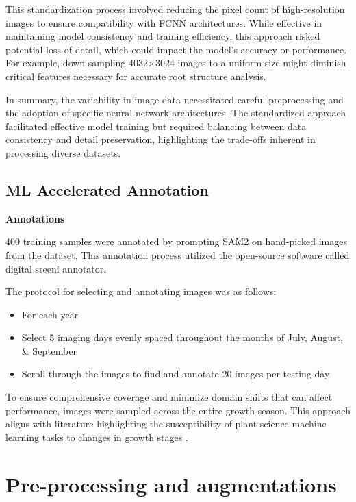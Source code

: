 This standardization process involved reducing the pixel count of high-resolution images to ensure compatibility with FCNN architectures. While effective in maintaining model consistency and training efficiency, this approach risked potential loss of detail, which could impact the model's accuracy or performance. For example, down-sampling 4032×3024 images to a uniform size might diminish critical features necessary for accurate root structure analysis. 

In summary, the variability in image data necessitated careful preprocessing and the adoption of specific neural network architectures. The standardized approach facilitated effective model training but required balancing between data consistency and detail preservation, highlighting the trade-offs inherent in processing diverse datasets. 

\subsection{ML Accelerated Annotation}
\textbf{Annotations}

400 training samples were annotated by prompting SAM2 on hand-picked images from the dataset. This annotation process utilized the open-source software called digital sreeni annotator.

The protocol for selecting and annotating images was as follows:
\begin{itemize}
    \item For each year
    \item Select 5 imaging days evenly spaced throughout the months of July, August, \& September
    \item Scroll through the images to find and annotate 20 images per testing day
\end{itemize}

To ensure comprehensive coverage and minimize domain shifts that can affect performance, images were sampled across the entire growth season. This approach aligns with literature highlighting the susceptibility of plant science machine learning tasks to changes in growth stages \cite{Banet2024}.

\section{Pre-processing and augmentations}


